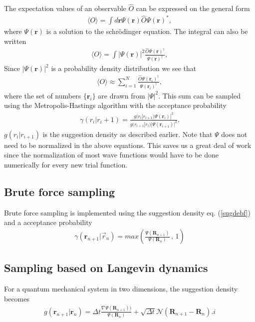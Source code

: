 \documentclass[a4paper,10pt,twocolumn]{article} %
\newcommand{\ts}[1]{\textbf{#1}}
\newcommand{\expec}[1]{\langle{}{#1}\rangle{}}
\begin{document}
The expectation values of an observable $\hat O$ can be expressed on the general form
\begin{align}
	\expec{ O } = \int d\ts r \Psi(\ts r) \hat O \Psi(\ts r)^*,\label{exv}
\end{align}
where $\Psi(\ts r)$ %
is a solution to the schrödinger equation. 
The integral can also be written 
\begin{align}
	\expec{ O } = \int |\Psi(\ts r)|^2 \frac{ \hat O \Psi(\ts r)^\dagger } {\Psi(\ts r)^\dagger},
\end{align}
Since $|\Psi(\ts r)|^2$ is a probability density distribution we see that
\begin{align}
	\expec{ O } \approx \sum_{i=1}^N \frac{ \hat O \Psi(\ts r_i)^\dagger } {\Psi(\ts r_i)^\dagger}, \label{RFQMC1} 
\end{align}
%
where the set of numbers $\{\ts r_i\}$ are drawn from $|\Psi|^2$.
This sum can be sampled using the Metropolis-Hastings algorithm with the acceptance probability 
\begin{align}
	\gamma(r_i|r_i+1)=\frac
		{g(r_i|r_{i+1})\Psi(\ts r_i)|^2}
		{g(r_{i+1}|r_i)|\Psi(\ts r_{i+1})|^2}.
\end{align} 
$g(r_i|r_{i+1})$ is the suggestion density as described earlier.
%
Note that $\Psi$ does not need to be normalized in the above equations. This saves us a great deal of work since the normalization 
of most wave functions would have to be done numerically for every new trial function.%

\subsection{Brute force sampling}%
Brute force sampling is implemented using the suggestion density eq. (\ref{sugdebf}) and a acceptance probability
\begin{align} 
	\gamma(\ts r_{n+1}|\vec r_n)=max\left(
	\frac
	{\Psi(\ts R_{n+1})}
    {\Psi(\ts R_n)}\, 
	,\, 1 \right) 
\end{align}

\subsection{Sampling based on Langevin dynamics}%
For a quantum mechanical system in two dimensions, the suggestion density becomes
\begin{align}
	g(\ts r_{n+1}|\ts r_n)=\Delta t \frac{\nabla \Psi(\ts R_{n+1}))}{\Psi (\ts R_n)} + \sqrt{\Delta t}\mathcal N(\ts R_{n+1}-\ts R_{n}).i
\end{align}
\end{document}
